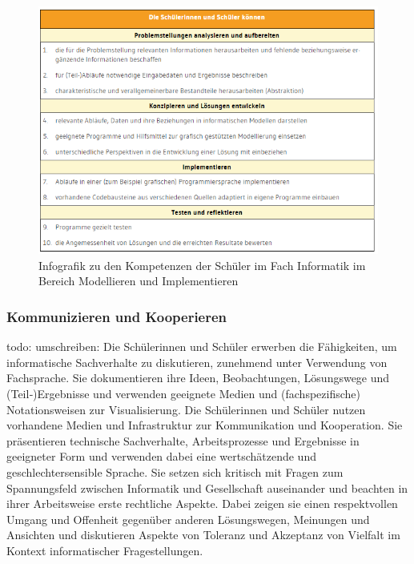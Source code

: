 \begin{figure}[H]
	\centering
	\includegraphics[width=\textwidth,height=\textheight,keepaspectratio]{images/model.png}
	\caption{Infografik zu den Kompetenzen der Schüler im Fach Informatik im Bereich Modellieren und Implementieren}
	\label{Modellieren und Implementieren Infografik}
\end{figure}

\subsubsection{Kommunizieren und Kooperieren}
todo: umschreiben: 
Die Schülerinnen und Schüler erwerben die Fähigkeiten, um informatische Sachverhalte zu diskutieren, zunehmend unter Verwendung von Fachsprache. Sie dokumentieren ihre Ideen, Beobachtungen, Lösungswege und (Teil‑)Ergebnisse und verwenden geeignete Medien und (fachspezifische) Notationsweisen zur Visualisierung. Die Schülerinnen und Schüler nutzen vorhandene Medien und Infrastruktur zur Kommunikation und Kooperation. Sie präsentieren technische Sachverhalte, Arbeitsprozesse und Ergebnisse in geeigneter Form und verwenden dabei eine wertschätzende und geschlechtersensible Sprache.
Sie setzen sich kritisch mit Fragen zum Spannungsfeld zwischen Informatik und Gesellschaft auseinander und beachten in ihrer Arbeitsweise erste rechtliche Aspekte. Dabei zeigen sie einen respektvollen Umgang und Offenheit gegenüber anderen Lösungswegen, Meinungen und Ansichten und diskutieren Aspekte von Toleranz und Akzeptanz von Vielfalt im Kontext informatischer Fragestellungen\cite{Model}.

